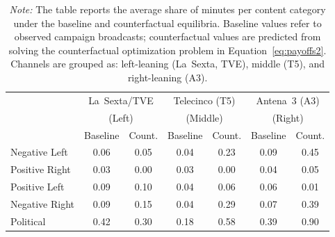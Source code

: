 \documentclass[12pt]{article}
\begin{document}
\begin{table}[!htbp]
	\caption{Baseline and Counterfactual Slant by Channel}
	\label{tab:counter}
	\centering\small
	\begin{tabular}{lcccccc}
		\toprule
		& \multicolumn{2}{c}{La~Sexta/TVE} & \multicolumn{2}{c}{Telecinco (T5)} & \multicolumn{2}{c}{Antena~3 (A3)} \\
		& \multicolumn{2}{c}{(Left)} & \multicolumn{2}{c}{(Middle)} & \multicolumn{2}{c}{(Right)} \\
		& Baseline & Count. & Baseline & Count. & Baseline & Count. \\
		\midrule
		Negative Left & 0.06 & 0.05 & 0.04 & 0.23 & 0.09 & 0.45 \\
		\midrule
		Positive Right & 0.03 & 0.00 & 0.03 & 0.00 & 0.04 & 0.05 \\
		\midrule
		Positive Left & 0.09 & 0.10 & 0.04 & 0.06 & 0.06 & 0.01 \\
		\midrule
		Negative Right & 0.09 & 0.15 & 0.04 & 0.29 & 0.07 & 0.39 \\
		\midrule
		Political & 0.42 & 0.30 & 0.18 & 0.58 & 0.39 & 0.90 \\
		\midrule
		\bottomrule
	\end{tabular}
	\vspace{0.5em}
	\caption*{\small \emph{Note:} The table reports the average share of minutes per content category under the baseline and counterfactual equilibria. Baseline values refer to observed campaign broadcasts; counterfactual values are predicted from solving the counterfactual optimization problem in Equation~\eqref{eq:payoffs2}. Channels are grouped as: left-leaning (La~Sexta, TVE), middle (T5), and right-leaning (A3).}
\end{table}
\end{document}
